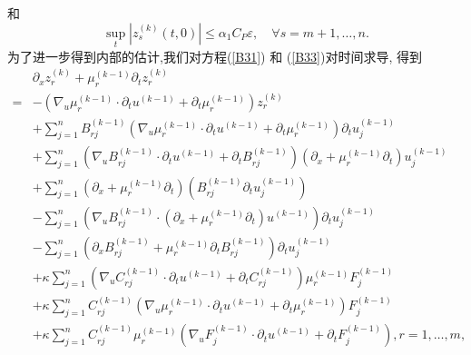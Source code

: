 \documentclass[notitlepage,cs4size,punct,oneside]{ctexrep}
\numberwithin{equation}{chapter}
\theoremstyle{mystyle}
\begin{document}
和
\begin{equation}\label{B46}
    \sup _{t}\left|z_{s}^{(k)}(t, 0)\right| \leq \alpha_{1} C_{P} \varepsilon, \quad \forall s=m+1, \ldots, n.
\end{equation}
为了进一步得到内部的估计,我们对方程(\ref{B31}) 和 (\ref{B33})对时间求导, 得到
\begin{align}
      & \partial_{x} z_{r}^{(k)}+\mu_{r}^{(k-1)} \partial_{t} z_{r}^{(k)}\nonumber                                                                                                                      \\
    = & -\left(\nabla_{u} \mu_{r}^{(k-1)} \cdot \partial_{t} u^{(k-1)} + \partial _{t} \mu _{r} ^{(k-1)}\right) z_{r}^{(k)}\nonumber                                                                    \\
      & +\sum_{j=1}^{n} B_{r j}^{(k-1)}\left(\nabla_{u} \mu_{r}^{(k-1)} \cdot \partial_{t} u^{(k-1)} + \partial _{t} \mu _{r} ^{(k-1)}\right) \partial_{t} u_{j}^{(k-1)}\nonumber                       \\
      & +\sum_{j=1}^{n}\left(\nabla_{u} B_{r j}^{(k-1)} \cdot \partial_{t} u^{(k-1)} + \partial_{t} B_{rj}^{(k-1)}\right)\left(\partial_{x}+\mu_{r}^{(k-1)} \partial_{t} \right) u_{j}^{(k-1)}\nonumber \\
      & +\sum_{j=1}^{n}\left(\partial_{x}+\mu_{r}^{(k-1)} \partial_{t}\right)\left(B_{r j}^{(k-1)} \partial_{t} u_{j}^{(k-1)}\right) \nonumber                                                          \\
      & -\sum_{j=1}^{n}\left(\nabla_{u} B_{r j}^{(k-1)} \cdot\left(\partial_{x}+\mu_{r}^{(k-1)} \partial_{t}\right) u^{(k-1)}\right) \partial_{t} u_{j}^{(k-1)}\nonumber                                \\
      & -\sum_{j=1}^{n}\left(\partial_{x}B_{r j}^{(k-1)}+\mu_{r}^{(k-1)} \partial_{t}B_{r j}^{(k-1)} \right) \partial_{t} u_{j}^{(k-1)}\nonumber                                                        \\
      & +\kappa \sum_{j=1}^{n}\left(\nabla_{u} C_{r j}^{(k-1)} \cdot \partial_{t} u^{(k-1)} + \partial_{t} C_{r j}^{(k-1)}\right) \mu_{r}^{(k-1)} F_j^{(k-1)}\nonumber                                  \\
      & +\kappa \sum_{j=1}^{n} C_{r j}^{(k-1)}\left(\nabla_{u} \mu_{r}^{(k-1)} \cdot \partial_{t} u^{(k-1)} + \partial _{t} \mu _{r} ^{(k-1)}\right) F_j^{(k-1)}\nonumber                               \\
      & +\kappa \sum_{j=1}^{n} C_{r j}^{(k-1)}\mu_{r}^{(k-1)} \left(\nabla_{u} F_{j}^{(k-1)} \cdot \partial_{t} u^{(k-1)} + \partial _{t} F_{j} ^{(k-1)}\right)
    , r=1, \ldots, m, \label{B47}
\end{align}
\end{document}
